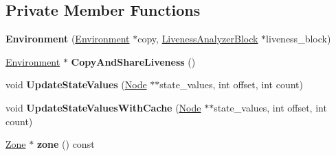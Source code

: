 \subsection*{Private Member Functions}
\begin{DoxyCompactItemize}
\item 
{\bfseries Environment} (\hyperlink{classv8_1_1internal_1_1compiler_1_1_ast_graph_builder_1_1_environment}{Environment} $\ast$copy, \hyperlink{classv8_1_1internal_1_1compiler_1_1_liveness_analyzer_block}{Liveness\+Analyzer\+Block} $\ast$liveness\+\_\+block)\hypertarget{classv8_1_1internal_1_1compiler_1_1_ast_graph_builder_1_1_environment_a933b2628cff5d28672bccdfe9dcc4d05}{}\label{classv8_1_1internal_1_1compiler_1_1_ast_graph_builder_1_1_environment_a933b2628cff5d28672bccdfe9dcc4d05}

\item 
\hyperlink{classv8_1_1internal_1_1compiler_1_1_ast_graph_builder_1_1_environment}{Environment} $\ast$ {\bfseries Copy\+And\+Share\+Liveness} ()\hypertarget{classv8_1_1internal_1_1compiler_1_1_ast_graph_builder_1_1_environment_a64118fda753ee5044787cb9bb975f9c0}{}\label{classv8_1_1internal_1_1compiler_1_1_ast_graph_builder_1_1_environment_a64118fda753ee5044787cb9bb975f9c0}

\item 
void {\bfseries Update\+State\+Values} (\hyperlink{classv8_1_1internal_1_1compiler_1_1_node}{Node} $\ast$$\ast$state\+\_\+values, int offset, int count)\hypertarget{classv8_1_1internal_1_1compiler_1_1_ast_graph_builder_1_1_environment_a7ada60337f61720cdf42bd1ac320b5f3}{}\label{classv8_1_1internal_1_1compiler_1_1_ast_graph_builder_1_1_environment_a7ada60337f61720cdf42bd1ac320b5f3}

\item 
void {\bfseries Update\+State\+Values\+With\+Cache} (\hyperlink{classv8_1_1internal_1_1compiler_1_1_node}{Node} $\ast$$\ast$state\+\_\+values, int offset, int count)\hypertarget{classv8_1_1internal_1_1compiler_1_1_ast_graph_builder_1_1_environment_a1a16eb87b351a027b7e9da04dcd4ffb2}{}\label{classv8_1_1internal_1_1compiler_1_1_ast_graph_builder_1_1_environment_a1a16eb87b351a027b7e9da04dcd4ffb2}

\item 
\hyperlink{classv8_1_1internal_1_1_zone}{Zone} $\ast$ {\bfseries zone} () const \hypertarget{classv8_1_1internal_1_1compiler_1_1_ast_graph_builder_1_1_environment_a024c67b8bee57c228d4198e59d182aa6}{}\label{classv8_1_1internal_1_1compiler_1_1_ast_graph_builder_1_1_environment_a024c67b8bee57c228d4198e59d182aa6}


\end{DoxyCompactItemize}
